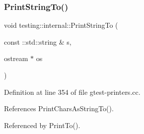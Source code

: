 \subsubsection{\texorpdfstring{Print\+String\+To()}{PrintStringTo()}\hspace{0.1cm}{\footnotesize\ttfamily [1/2]}}
{\footnotesize\ttfamily void testing\+::internal\+::\+Print\+String\+To (\begin{DoxyParamCaption}\item[{const \+::std\+::string \&}]{s,  }\item[{ostream $\ast$}]{os }\end{DoxyParamCaption})}



Definition at line 354 of file gtest-\/printers.\+cc.



References Print\+Chars\+As\+String\+To().



Referenced by Print\+To().



